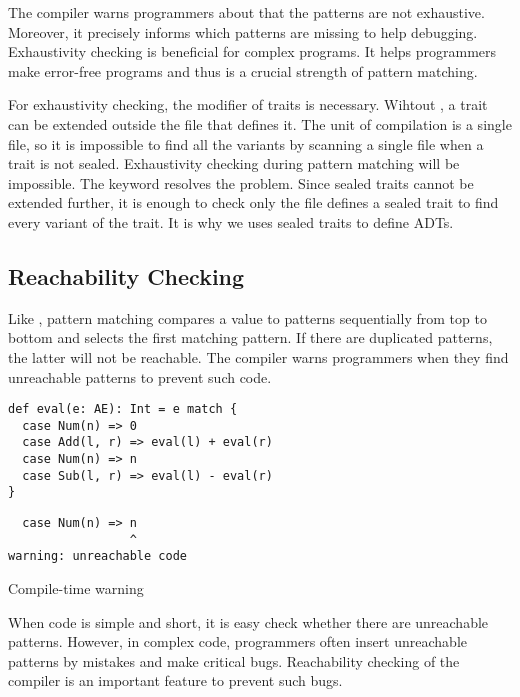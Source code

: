 The compiler warns programmers about that the patterns are not exhaustive. Moreover, it precisely
informs which patterns are missing to help debugging.
Exhaustivity checking is beneficial for complex programs. It helps programmers make
error-free programs and thus is a crucial strength of pattern matching.

For exhaustivity checking, the  modifier of traits is necessary.
Wihtout , a trait can be extended outside the file that defines it.
The unit of compilation is a single file, so it is impossible to find
all the variants by scanning a single file when a trait is not sealed.
Exhaustivity checking during pattern matching will be impossible.
The  keyword resolves the problem. Since sealed traits cannot be
extended further, it is enough to check only the file defines a sealed trait to find
every variant of the trait. It is why we uses sealed traits to define ADTs.

\subsection{Reachability Checking}

Like , pattern
matching compares a value to patterns sequentially from top to bottom and selects
the first matching pattern. If there are duplicated patterns, the latter will
not be reachable.
The compiler warns programmers when they find unreachable patterns to prevent such code.

\begin{verbatim}
def eval(e: AE): Int = e match {
  case Num(n) => 0
  case Add(l, r) => eval(l) + eval(r)
  case Num(n) => n
  case Sub(l, r) => eval(l) - eval(r)
}
\end{verbatim}
\vspace{-1em}
\begin{mdframed}[hidealllines=true,backgroundcolor=yellow!10,innerleftmargin=3pt,innerrightmargin=3pt,leftmargin=-3pt,rightmargin=-3pt]
\begin{verbatim}
  case Num(n) => n
                 ^
warning: unreachable code
\end{verbatim}
\vspace{-2em}
\begin{flushright}
\scriptsize\textsf{Compile-time warning}
\end{flushright}
\end{mdframed}

When code is simple and short, it is easy check whether there are unreachable
patterns. However, in complex code, programmers often insert unreachable
patterns by mistakes and make critical bugs. Reachability checking of the
compiler is an important feature to prevent such bugs.

